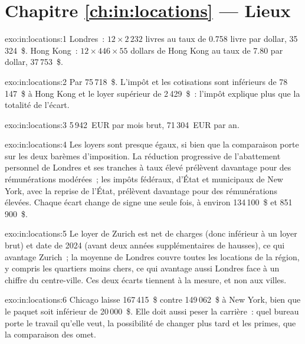 \section*{Chapitre \ref{ch:in:locations} --- Lieux}

\begin{solution}{exo:in:locations:1}
Londres~: $12\times2\,232$ livres au taux de 0.758 livre par dollar, 35\,324~\$. Hong Kong~: $12\times446\times55$ dollars de Hong Kong au
taux de 7.80 par dollar, 37\,753~\$.
\end{solution}

\begin{solution}{exo:in:locations:2}
Par 75\,718~\$. L'impôt et les cotisations sont inférieurs de 78\,147~\$ à Hong Kong et le loyer supérieur de 2\,429~\$~: l'impôt
explique plus que la totalité de l'écart.
\end{solution}

\begin{solution}{exo:in:locations:3}
5\,942~EUR par mois brut, 71\,304~EUR par an.
\end{solution}

\begin{solution}{exo:in:locations:4}
Les loyers sont presque égaux, si bien que la comparaison porte sur les deux barèmes d'imposition. La réduction progressive de l'abattement personnel de Londres et
ses tranches à taux élevé prélèvent davantage pour des rémunérations modérées~; les impôts fédéraux, d'État et municipaux de New York, avec la reprise de l'État,
prélèvent davantage pour des rémunérations élevées. Chaque écart change de signe une seule fois, à environ 134\,100~\$ et 851\,900~\$.
\end{solution}

\begin{solution}{exo:in:locations:5}
Le loyer de Zurich est net de charges (donc inférieur à un loyer brut) et date de 2024 (avant deux années supplémentaires de
hausses), ce qui avantage Zurich~; la moyenne de Londres couvre toutes les locations de la région, y compris les quartiers
moins chers, ce qui avantage aussi Londres face à un chiffre du centre-ville. Ces deux écarts tiennent à la mesure, et non aux villes.
\end{solution}

\begin{solution}{exo:in:locations:6}
Chicago laisse 167\,415~\$ contre 149\,062~\$ à New York, bien que le paquet soit inférieur de 20\,000~\$. Elle doit aussi peser
la carrière~: quel bureau porte le travail qu'elle veut, la possibilité de changer plus tard et les primes, que la comparaison
des  omet.
\end{solution}

